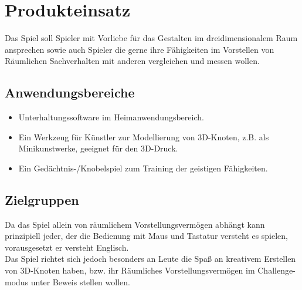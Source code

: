 \chapter{Produkteinsatz}

Das Spiel soll Spieler mit Vorliebe für das Gestalten im dreidimensionalem Raum ansprechen sowie auch Spieler die gerne ihre Fähigkeiten im Vorstellen von Räumlichen Sachverhalten mit anderen vergleichen und messen wollen.

\section{Anwendungsbereiche}


\begin{itemize}

	\item Unterhaltungssoftware im Heimanwendungsbereich. 
	
	\item Ein Werkzeug für Künstler zur Modellierung von 3D-Knoten, z.B. als Minikunstwerke, geeignet für den 3D-Druck.
	
	\item Ein Gedächtnis-/Knobelspiel zum Training der
	geistigen Fähigkeiten.
	
	
	
\end{itemize}

\section{Zielgruppen}

Da das Spiel allein von räumlichem Vorstellungsvermögen abhängt kann prinzipiell jeder, der die Bedienung mit Maus und Tastatur versteht es spielen, vorausgesetzt er versteht Englisch.
\\
Das Spiel richtet sich jedoch besonders an Leute die Spaß an kreativem Erstellen von 3D-Knoten haben, bzw. ihr Räumliches Vorstellungsvermögen im Challenge-modus unter Beweis stellen wollen.





